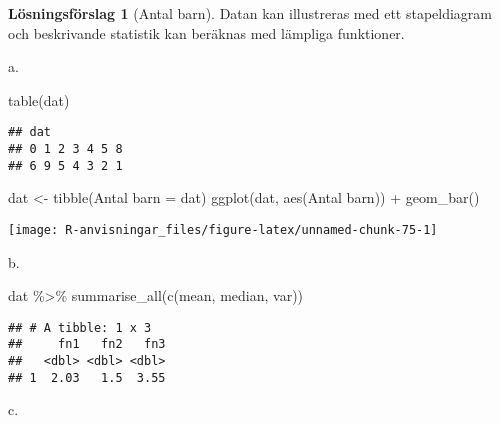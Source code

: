 \documentclass[
]{book}
\newenvironment{Shaded}{\begin{snugshade}}{\end{snugshade}}
\newcommand{\AttributeTok}[1]{\textcolor[rgb]{0.77,0.63,0.00}{#1}}
\newcommand{\FunctionTok}[1]{\textcolor[rgb]{0.00,0.00,0.00}{#1}}
\newcommand{\NormalTok}[1]{#1}
\newcommand{\OtherTok}[1]{\textcolor[rgb]{0.56,0.35,0.01}{#1}}
\newcommand{\SpecialCharTok}[1]{\textcolor[rgb]{0.00,0.00,0.00}{#1}}
\newcommand{\StringTok}[1]{\textcolor[rgb]{0.31,0.60,0.02}{#1}}
\theoremstyle{definition}
\theoremstyle{definition}
\theoremstyle{definition}
\theoremstyle{definition}
\newtheorem{hypothesis}{Lösningsförslag}[chapter]
\theoremstyle{remark}
\begin{document}
\begin{hypothesis}[Antal barn]
Datan kan illustreras med ett stapeldiagram och beskrivande statistik kan beräknas med lämpliga funktioner.

a.

\begin{Shaded}
\begin{Highlighting}[]
\FunctionTok{table}\NormalTok{(dat)}
\end{Highlighting}
\end{Shaded}

\begin{verbatim}
## dat
## 0 1 2 3 4 5 8 
## 6 9 5 4 3 2 1
\end{verbatim}

\begin{Shaded}
\begin{Highlighting}[]
\NormalTok{dat }\OtherTok{\textless{}{-}} \FunctionTok{tibble}\NormalTok{(}\StringTok{\textasciigrave{}}\AttributeTok{Antal barn}\StringTok{\textasciigrave{}} \OtherTok{=}\NormalTok{ dat)}
\FunctionTok{ggplot}\NormalTok{(dat, }\FunctionTok{aes}\NormalTok{(}\StringTok{\textasciigrave{}}\AttributeTok{Antal barn}\StringTok{\textasciigrave{}}\NormalTok{)) }\SpecialCharTok{+}
  \FunctionTok{geom\_bar}\NormalTok{()}
\end{Highlighting}
\end{Shaded}

\begin{center}\texttt{[image: R-anvisningar\_files/figure-latex/unnamed-chunk-75-1]} \end{center}

b.

\begin{Shaded}
\begin{Highlighting}[]
\NormalTok{dat }\SpecialCharTok{\%\textgreater{}\%} \FunctionTok{summarise\_all}\NormalTok{(}\FunctionTok{c}\NormalTok{(mean, median, var))}
\end{Highlighting}
\end{Shaded}

\begin{verbatim}
## # A tibble: 1 x 3
##     fn1   fn2   fn3
##   <dbl> <dbl> <dbl>
## 1  2.03   1.5  3.55
\end{verbatim}

c.

\begin{Shaded}
\end{Shaded}


\end{hypothesis}
\end{document}
